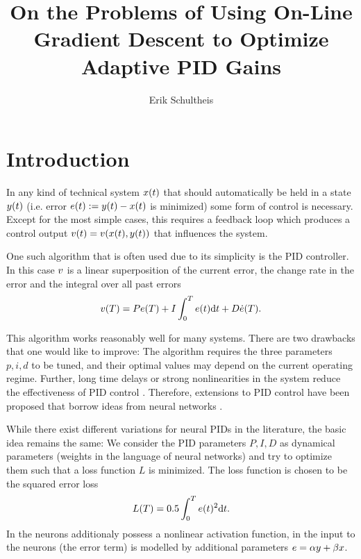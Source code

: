 \documentclass{article}
\begin{document}
  \title{On the Problems of Using On-Line Gradient Descent to Optimize Adaptive PID Gains}
  \author{Erik Schultheis}
  \maketitle

  \clearpage
  \section{Introduction}
    In any kind of technical system $x(t)$ that should automatically 
    be held in a state $y(t)$ (i.e. error $e(t) := y(t) - x(t)$ is 
    minimized) some form of control is necessary. 
    Except for the most simple cases, this requires a feedback loop which produces a 
    control output $v(t) = v(x(t), y(t))$ that influences the system.


    One such algorithm that is often used due to its simplicity is the PID controller. 
    In this case $v$ is a linear superposition of the current error, 
    the change rate in the error and the integral over all past errors
    \begin{align}
        v(T) = P e(T) + I \int_0^T e(t) \mathrm{d}t + D \dot{e}(T). 
        \label{eq:control_equation}
    \end{align}

    This algorithm works reasonably well for many systems.
    There are two drawbacks that one would like to improve: The algorithm requires 
    the three parameters $p, i, d$ to be tuned, and their optimal values may depend 
    on the current operating regime. Further, long time delays or strong nonlinearities in the 
    system reduce the effectiveness of PID control \cite{}.
    Therefore, extensions to PID control have been proposed that borrow ideas from neural networks 
    \cite{cong_novel_2005,yu_applying_2006,shu_pid_2000}.

    While there exist different variations for neural PIDs in the literature, 
    the basic idea remains the same: We consider the PID parameters $P, I, D$ as dynamical 
    parameters (weights in the language of neural networks) and try to optimize them such that a 
    loss function $L$ is minimized. 
    The loss function is chosen to be the squared error loss 
    \begin{align}
        L(T) = 0.5 \int_0^T e(t)^2 \mathrm{d}t. \label{eq:l2loss}
    \end{align}
    In \cite{shu_pid_2000} the neurons additionaly possess a nonlinear activation function, in
     \cite{} the input to the neurons (the error term) is modelled by additional parameters 
    $e = \alpha y + \beta x$.
\end{document}
